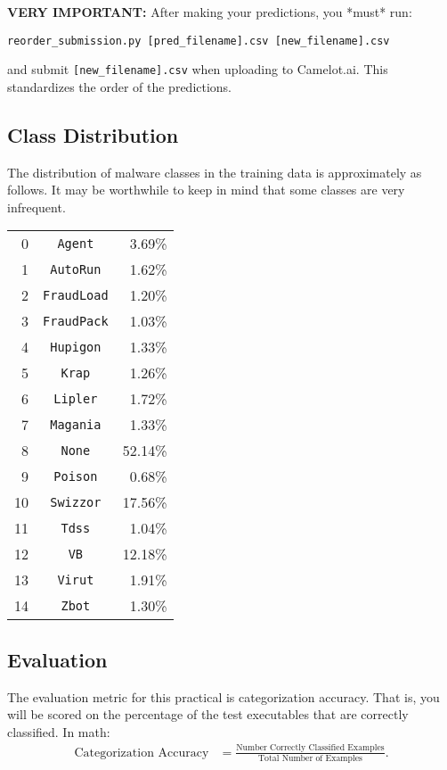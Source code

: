 \documentclass[12pt]{article}
\begin{document}
\begin{itemize}
 \textbf{VERY IMPORTANT:} After making your predictions, you *must* run:
\begin{verbatim}
reorder_submission.py [pred_filename].csv [new_filename].csv
\end{verbatim}
and submit \texttt{[new\_filename].csv} when uploading to Camelot.ai. 
This standardizes the order of the predictions.

\end{itemize}

\subsection*{Class Distribution}
The distribution of malware classes in the training data is approximately as follows. It may be worthwhile to keep in mind that some classes are very infrequent.
\begin{center}
\begin{tabular}{r c r}
    0 &\verb|Agent| & 3.69\% \\
    1 &\verb|AutoRun| & 1.62\% \\
    2 &\verb|FraudLoad| & 1.20\%\\
    3 &\verb|FraudPack| & 1.03\%\\
    4 &\verb|Hupigon| & 1.33\%\\
    5 &\verb|Krap| & 1.26\%    \\
    6 &\verb|Lipler| & 1.72\%\\
    7 &\verb|Magania| & 1.33\%\\
    8 &\verb|None| & 52.14\%\\
    9 &\verb|Poison| & 0.68\%\\
    10 &\verb|Swizzor| & 17.56\%\\
    11 &\verb|Tdss| & 1.04\%\\
    12 &\verb|VB| & 12.18\%\\
    13 &\verb|Virut| & 1.91\%\\
    14 &\verb|Zbot| & 1.30\%
    \end{tabular}
    \end{center}

\subsection*{Evaluation}
The evaluation metric for this practical is categorization accuracy. That is, you will be scored on the percentage of the test executables that are correctly classified. In math: 
\begin{align*}
    \text{Categorization Accuracy} &= \frac{\text{Number Correctly Classified Examples}}{\text{Total Number of Examples}}.
\end{align*}
\end{document}
